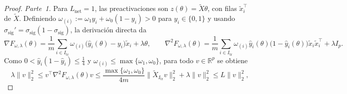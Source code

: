 \documentclass[a4paper,openany,oneside,10pt]{report}
\theoremstyle{pnlTeorema}
\theoremstyle{pnlDefinicion}
\theoremstyle{pnlObservacion}
\begin{document}
\begin{proof}
\emph{Parte~1.} Para $L_{\mathrm{net}}=1$, las preactivaciones son $z(\theta)=\widetilde{X}\theta$, con filas $\tilde x_i^\top$ de $\widetilde{X}$. Definiendo $\omega_{(i)}:=\omega_1 y_i+\omega_0(1-y_i)>0$ para $y_i\in\{0,1\}$ y usando $\sigma_{\mathrm{sig}}'=\sigma_{\mathrm{sig}}(1-\sigma_{\mathrm{sig}})$, la derivación directa da
\[
\nabla F_{\omega,\lambda}(\theta)=\frac{1}{m}\sum_{i\in I_{\mathrm{tr}}}\omega_{(i)}\bigl(\hat y_i(\theta)-y_i\bigr)\tilde x_i+\lambda\theta,
\qquad
\nabla^2 F_{\omega,\lambda}(\theta)=\frac{1}{m}\sum_{i\in I_{\mathrm{tr}}}\omega_{(i)}\hat y_i(\theta)\bigl(1-\hat y_i(\theta)\bigr)\tilde x_i\tilde x_i^\top+\lambda I_p.
\]
Como $0<\hat y_i(1-\hat y_i)\le\frac14$ y $\omega_{(i)}\le\max\{\omega_1,\omega_0\}$, para todo $v\in\mathbb{R}^p$ se obtiene
\[
\lambda\|v\|_2^2 \le v^\top\nabla^2 F_{\omega,\lambda}(\theta)v
\le \frac{\max\{\omega_1,\omega_0\}}{4m}\|\widetilde{X}_{I_{\mathrm{tr}}}v\|_2^2+\lambda\|v\|_2^2 \le L\|v\|_2^2,
\]

\end{proof}
\end{document}
